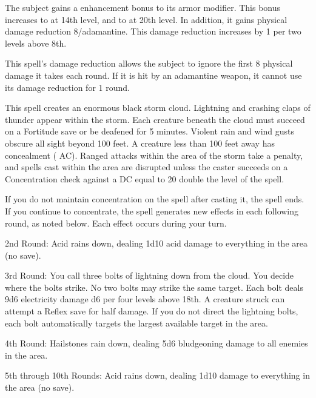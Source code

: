 \spelldur{\durshort}
\begin{spelleffect}
    The subject gains a  enhancement bonus to its armor modifier. This bonus increases to  at 14th level, and to  at 20th level. In addition, it gains physical damage reduction 8/adamantine. This damage reduction increases by 1 per two levels above 8th.
\end{spelleffect}
\begin{spellnotes}
  This spell's damage reduction allows the subject to ignore the first 8 physical damage it takes each round. If it is hit by an adamantine weapon, it cannot use its damage reduction for 1 round.
\end{spellnotes}

\spellrng{\rngfar}
\begin{spelleffect}
  This spell creates an enormous black storm cloud. Lightning and crashing claps of thunder appear within the storm. Each creature beneath the cloud must succeed on a Fortitude save or be deafened for 5 minutes. Violent rain and wind gusts obscure all sight beyond 100 feet. A creature less than 100 feet away has concealment ( AC). Ranged attacks within the area of the storm take a  penalty, and spells cast within the area are disrupted unless the caster succeeds on a Concentration check against a DC equal to 20 \add double the level of the spell.
  \par If you do not maintain concentration on the spell after casting it, the spell ends. If you continue to concentrate, the spell generates new effects in each following round, as noted below. Each effect occurs during your turn.
  \par 2nd Round: Acid rains down, dealing 1d10 acid damage to everything in the area (no save).
  \par 3rd Round: You call three bolts of lightning down from the cloud. You decide where the bolts strike. No two bolts may strike the same target. Each bolt deals 9d6 electricity damage \add d6 per four levels above 18th. A creature struck can attempt a Reflex save for half damage. If you do not direct the lightning bolts, each bolt automatically targets the largest available target in the area.
  \par 4th Round: Hailstones rain down, dealing 5d6 bludgeoning damage to all enemies in the area.
  \par 5th through 10th Rounds: Acid rains down, dealing 1d10 damage to everything in the area (no save).
\end{spelleffect}

